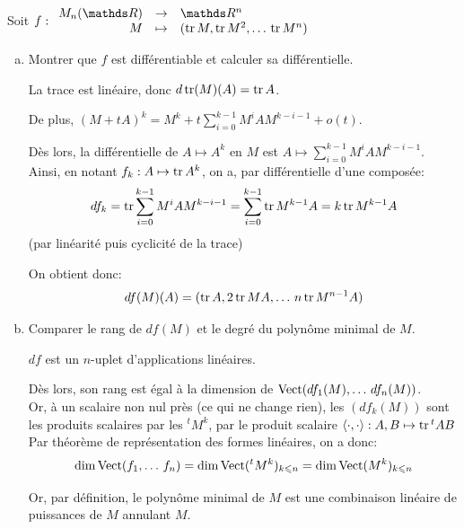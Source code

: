 \documentclass[a4paper, 12pt]{article}
\begin{document}
	Soit $
		f:
		\begin{array}{rcl}
			M_n(\R) & \rightarrow & \R^n \\
			M & \mapsto & (\tr M, \tr M^2, \dots\, \tr M^n) \\
		\end{array}
		$
		
	\begin{enumerate}[a)]
		\item Montrer que $f$ est différentiable et calculer sa différentielle.
		
		\begin{corr}
			La trace est linéaire, donc $d \operatorname{tr} (M)(A) = \operatorname{tr} A $.
			
			De plus, $ \displaystyle (M+tA)^k = M^k + t\sum_{i=0}^{k-1}M^iAM^{k-i-1} + o(t)$.
			
			Dès lors, la différentielle de $A \mapsto A^k$ en $M$ est $\displaystyle A \mapsto \sum_{i=0}^{k-1}M^iAM^{k-i-1}$. \\
			
			Ainsi, en notant $f_k:  A \mapsto \operatorname{tr} A^k$, on a, par différentielle d'une composée:
			$$ df_k = \operatorname{tr} \sum_{i=0}^{k-1} M^i A M^{k-i-1} = \sum_{i=0}^{k-1} \operatorname{tr} M^{k-1}A = k \operatorname{tr} M^{k-1} A $$
			(par linéarité puis cyclicité de la trace)
			
			On obtient donc:
			$$ df(M)(A) = (\operatorname{tr} A, 2 \operatorname{tr} MA, \dots\, n\operatorname{tr} M^{n-1}A)$$
			
		\end{corr}
		
		\item Comparer le rang de $df (M)$ et le degré du polynôme minimal de $M$.
		\begin{corr}
			$df$ est un $n$-uplet d'applications linéaires.
			
			Dès lors, son rang est égal à la dimension de $\Vect (df_1(M), \dots\, df_n(M))$. \\
			
			Or, à un scalaire non nul près (ce qui ne change rien), les $(df_k(M))$ sont les produits scalaires par les ${}^tM^k$, par le produit scalaire $\left\langle \cdot, \cdot\right\rangle: A, B \mapsto \operatorname{tr} {}^tA B$ \\
			
			Par théorème de représentation des formes linéaires, on a donc:
			$$\dim \Vect (f_1, \dots\, f_n) = \dim \Vect ({}^t M^k)_{k \leqslant n} =  \dim \Vect (M^k)_{k \leqslant n}$$
			
			Or, par définition, le polynôme minimal de $M$ est une combinaison linéaire de puissances de $M$ annulant $M$.
			

\end{corr}
\end{enumerate}
\end{document}
